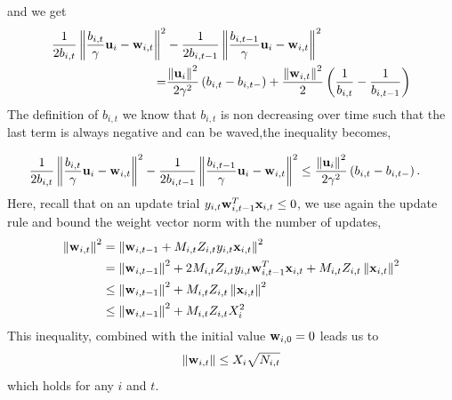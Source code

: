 and we get
\begin{equation*}
\begin{split}
\frac{1}{2b_{i,t}}\left\Vert {\frac{b_{i,t}}{\gamma} \mathbf{u}_i-\mathbf{w}_{i,t}} \right\Vert^2&-\frac{1}{2b_{i,t-1}}\left\Vert {\frac{b_{i,t-1}}{\gamma} \mathbf{u}_i-\mathbf{w}_{i,t}} \right\Vert^2\\
=&\frac{\left\Vert {\mathbf{u}_i} \right\Vert^2}{2\gamma^2}\left({b_{{i,t}}-b_{{i,t-}}}\right)
+\frac{\left\Vert {\mathbf{w}_{i,t}} \right\Vert^2}{2}\left({\frac{1}{b_{i,t}}-\frac{1}{b_{i,t-1}}}\right)
\end{split}
\end{equation*}
The definition of $b_{i,t}$ we know that $b_{i,t}$ is non decreasing over time such that the last term is always negative and can be waved,the inequality becomes,

\begin{equation}
\begin{split}
\frac{1}{2b_{i,t}}\left\Vert {\frac{b_{i,t}}{\gamma} \mathbf{u}_i-\mathbf{w}_{i,t}} \right\Vert^2&-\frac{1}{2b_{i,t-1}}\left\Vert {\frac{b_{i,t-1}}{\gamma} \mathbf{u}_i-\mathbf{w}_{i,t}} \right\Vert^2
\le\frac{\left\Vert {\mathbf{u}_i} \right\Vert^2}{2\gamma^2}\left({b_{{i,t}}-b_{{i,t-}}}\right)
.
\end{split}
\label{eq:difference_of_norm_ineq}
\end{equation}
Here, recall that on an update trial $y_{i,t}\mathbf{w}_{i,t-1}^{T}\mathbf{x}_{i,t}\le0$, we use again the update rule and  bound the weight vector norm with the number of updates, 
\begin{equation*}
\begin{split}
\left\Vert {\mathbf{w}_{i,t}} \right\Vert^2&=\left\Vert {\mathbf{w}_{i,t-1}+M_{i,t}Z_{i,t}y_{i,t}\mathbf{x}_{i,t}} \right\Vert^2\\
&=\left\Vert {\mathbf{w}_{i,t-1}} \right\Vert^2+ 2M_{i,t}Z_{i,t}y_{i,t}\mathbf{w}_{i,t-1}^{T}\mathbf{x}_{i,t}+M_{i,t}Z_{i,t}\left\Vert {\mathbf{x}_{i,t}} \right\Vert^2\\
&\le\left\Vert {\mathbf{w}_{i,t-1}} \right\Vert^2+M_{i,t}Z_{i,t}\left\Vert {\mathbf{x}_{i,t}} \right\Vert^2\\
&\le\left\Vert {\mathbf{w}_{i,t-1}} \right\Vert^2+M_{i,t}Z_{i,t}X_i^2
\end{split}
\end{equation*}
This inequality, combined with the initial value $\mathbf{w}_{i,0}=0$ leads us to
\begin{equation}
\Vert\mathbf{w}_{i,t}\Vert\le X_i\sqrt{N_{i,t}}
\label{eq:bound_on_w}
\end{equation}
which holds for any $i$ and $t$. 

